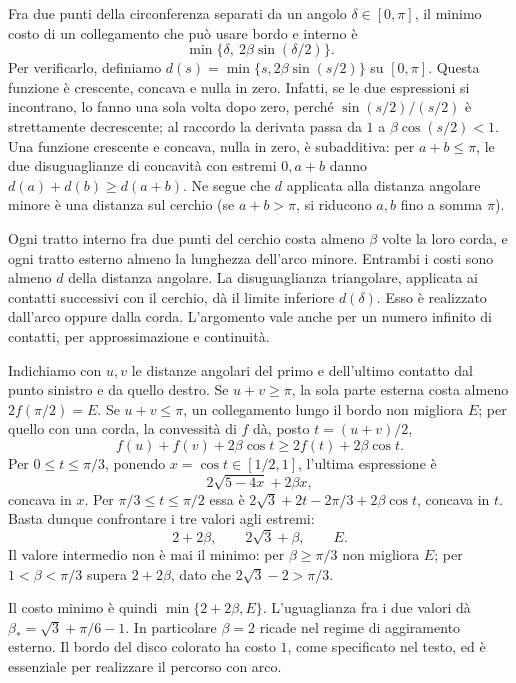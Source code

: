 {Fra due punti della circonferenza separati da un angolo $\delta\in[0,\pi]$, il minimo costo di un collegamento che può usare bordo e interno è
\[
\min\{\delta,\ 2\beta\sin(\delta/2)\}.
\]
Per verificarlo, definiamo $d(s)=\min\{s,2\beta\sin(s/2)\}$ su $[0,\pi]$. Questa funzione è crescente, concava e nulla in zero. Infatti, se le due espressioni si incontrano, lo fanno una sola volta dopo zero, perché $\sin(s/2)/(s/2)$ è strettamente decrescente; al raccordo la derivata passa da $1$ a $\beta\cos(s/2)<1$. Una funzione crescente e concava, nulla in zero, è subadditiva: per $a+b\leq\pi$, le due disuguaglianze di concavità con estremi $0,a+b$ danno $d(a)+d(b)\geq d(a+b)$. Ne segue che $d$ applicata alla distanza angolare minore è una distanza sul cerchio (se $a+b>\pi$, si riducono $a,b$ fino a somma $\pi$).

Ogni tratto interno fra due punti del cerchio costa almeno $\beta$ volte la loro corda, e ogni tratto esterno almeno la lunghezza dell'arco minore. Entrambi i costi sono almeno $d$ della distanza angolare. La disuguaglianza triangolare, applicata ai contatti successivi con il cerchio, dà il limite inferiore $d(\delta)$. Esso è realizzato dall'arco oppure dalla corda. L'argomento vale anche per un numero infinito di contatti, per approssimazione e continuità.

Indichiamo con $u,v$ le distanze angolari del primo e dell'ultimo contatto dal punto sinistro e da quello destro. Se $u+v\geq\pi$, la sola parte esterna costa almeno $2f(\pi/2)=E$. Se $u+v\leq\pi$, un collegamento lungo il bordo non migliora $E$; per quello con una corda, la convessità di $f$ dà, posto $t=(u+v)/2$,
\[
f(u)+f(v)+2\beta\cos t\geq2f(t)+2\beta\cos t.
\]
Per $0\leq t\leq\pi/3$, ponendo $x=\cos t\in[1/2,1]$, l'ultima espressione è
\[
2\sqrt{5-4x}+2\beta x,
\]
concava in $x$. Per $\pi/3\leq t\leq\pi/2$ essa è $2\sqrt3+2t-2\pi/3+2\beta\cos t$, concava in $t$. Basta dunque confrontare i tre valori agli estremi:
\[
2+2\beta,\qquad2\sqrt3+\beta,\qquad E.
\]
Il valore intermedio non è mai il minimo: per $\beta\geq\pi/3$ non migliora $E$; per $1<\beta<\pi/3$ supera $2+2\beta$, dato che $2\sqrt3-2>\pi/3$.

Il costo minimo è quindi $\min\{2+2\beta,E\}$. L'uguaglianza fra i due valori dà $\beta_* =\sqrt3+\pi/6-1$. In particolare $\beta=2$ ricade nel regime di aggiramento esterno. Il bordo del disco colorato ha costo $1$, come specificato nel testo, ed è essenziale per realizzare il percorso con arco.
}

